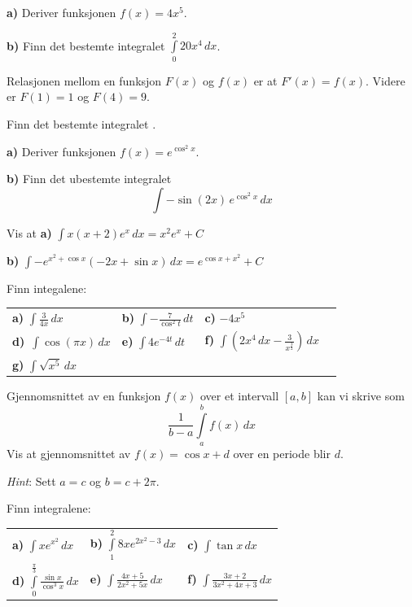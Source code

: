 



	
\eqlen	
\opgt
\setcounter{section}{1}
\textbf{a)} Deriver funksjonen $ f(x)=4x^5 $.\os

\textbf{b)} Finn det bestemte integralet $ \int\limits_0^2 20 x^4 \, dx $.

Relasjonen mellom en funksjon $ F(x) $ og $f(x) $ er at $ F'(x)=f(x) $. Videre er $ F(1)=1 $ og $ F(4)=9 $.\os

Finn det bestemte integralet .

\textbf{a)} Deriver funksjonen $ f(x)=e^{\cos^2 x} $.\os

\textbf{b)} Finn det ubestemte integralet \[ \int -\sin (2x)\, e^{\cos^2 x}\,dx \]\vs\vs

Vis at\os
\textbf{a)} $\displaystyle \int x(x+2)e^x \,dx = x^2 e^x + C $ \os

\textbf{b)} $\displaystyle \int -e^{x^2+\cos x} (-2 x+\sin x)\,dx= e^{\cos x+x^2}+C  $

\nes

Finn integalene:\os
\begin{tabular}{@{}l l l l}	
\textbf{a)} $ \displaystyle \int \frac{3}{4 x} \,dx$ &\quad \textbf{b)} $ \displaystyle \int-\frac{7}{\cos^2 t}\,dt $ &\quad \textbf{c)} $ -4x^5 $ \\[20 pt]
\textbf{d)}\ $\displaystyle \int \cos(\pi x) \,dx$ & \quad
\textbf{e)} $\displaystyle \int 4e^{-4t} \,dt$ &\quad\textbf{f)} $ \displaystyle \int \left(2x^4\,dx - \frac{3}{x^{\frac{3}{2}}}\right) \,dx$ \\[20pt]
\textbf{g)} $\displaystyle \int \sqrt{x^5}\,dx $
\end{tabular} 
\newpage
{}
Gjennomsnittet av en funksjon $ f(x) $ over et intervall $ [a, b] $ kan vi skrive som
\[ \frac{1}{b-a}\int\limits_a^b f(x)\,dx \]
Vis at gjennomsnittet av $f(x)=\cos x+d  $ over en periode blir $ d $. \os

\textsl{Hint}: Sett $ a=c $ og $ b=c+2\pi $.

Finn integralene:\os

\begin{tabular}{@{}l l l}	
\textbf{a)} $\displaystyle \int xe^{x^2} \, dx  $ &\;\textbf{b)} $\displaystyle \int\limits_1^2 8xe^{2x^2-3}\,dx $ &\;\textbf{c)} $\displaystyle \int \tan x \, dx $ \\ \vspace{3pt} 
\textbf{d)} $ \displaystyle \int\limits_0^\frac{\pi}{3}\frac{\sin x}{\cos^3 x} \, dx $ &\;\textbf{e)} $ \displaystyle \int \frac{4x+5}{2x^2 + 5x}\,dx $
&\;\textbf{f)} $ \displaystyle \int \frac{3x+2}{3x^2 + 4x+3}\,dx $
\end{tabular} 

